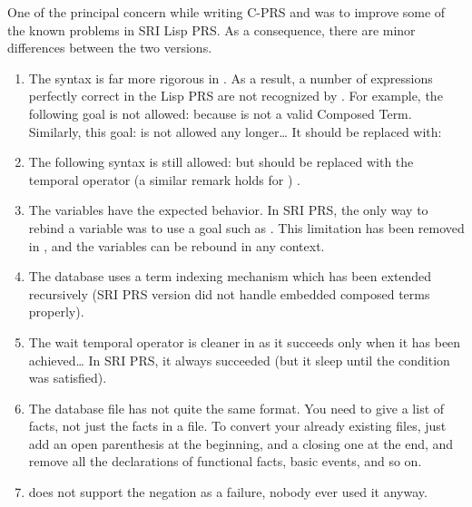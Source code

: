 One of the principal concern while writing C-PRS and \COPRS{} was to
improve some of the known problems in SRI Lisp PRS. As a consequence, there
are minor differences between the two versions.

\begin{enumerate}

\item The syntax is far more rigorous in \COPRS{}. As a result, a
number of expressions perfectly correct in the Lisp PRS are not
recognized by \COPRS{}. For example, the following goal is not allowed: \*
 \*
because \*
 \*
is not a valid Composed Term. Similarly, this goal: \*
 \*
is not allowed any longer\dots{} It should be replaced with: \*

\item The following syntax is still allowed: \*
 \*
but should be replaced with the \code{=>} temporal operator (a similar
remark holds for \code{~>}) .

\item The  variables have the expected behavior. In SRI PRS, the
only way to rebind a variable was to use a goal such as . This limitation has been removed in \COPRS{}, and the 
variables can be rebound in any context.

\item The database uses a term indexing mechanism which has been extended
recursively (SRI PRS version did not handle embedded composed terms
properly).

\item The wait temporal operator is cleaner in \COPRS{} as it succeeds only
when it has been achieved\dots{} In SRI PRS, it always succeeded (but it
sleep until the condition was satisfied).

\item The database file has not quite the same format. You need to give a
list of facts, not just the facts in a file. To convert your already
existing files, just add an open parenthesis at the beginning, and a
closing one at the end, and remove all the declarations of functional
facts, basic events, and so on.

\item \COPRS{} does not support the negation as a failure, nobody ever used
it anyway.


\end{enumerate}
